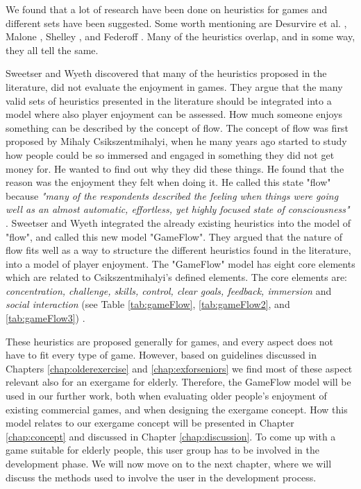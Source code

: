 We found that a lot of research have been done on heuristics for games and different sets have been suggested. Some worth mentioning are Desurvire et al. \cite{desurvire}, Malone \cite{malone}, Shelley \cite{shelley}, and Federoff \cite{federoff}. Many of the heuristics overlap, and in some way, they all tell the same. 

Sweetser and Wyeth \cite{sweetser} discovered that many of the heuristics proposed in the literature, did not evaluate the enjoyment in games. They argue that the many valid sets of heuristics presented in the literature should be integrated into a model where also player enjoyment can be assessed. How much someone enjoys something can be described by the concept of flow. The concept of flow was first proposed by  Mihaly Csikszentmihalyi, when he many years ago started to study how people could be so immersed and engaged in something they did not get money for. He wanted to find out why they did these things. He found that the reason was the enjoyment they felt when doing it. He called this state "flow" because \emph{"many of the respondents described the feeling when things were going well as an almost automatic, effortless, yet highly focused state of consciousness"} \cite{flow}.  Sweetser and Wyeth integrated the already existing heuristics into the model of "flow", and called this new model "GameFlow". They argued that the nature of flow fits well as a way to structure the different heuristics found in the literature, into a model of player enjoyment. The "GameFlow" model has eight core elements which are related to Csikszentmihalyi's defined elements. The core elements are: \emph{concentration, challenge, skills, control, clear goals, feedback, immersion} and \emph{social interaction} (see Table \ref{tab:gameFlow}, \ref{tab:gameFlow2}, and \ref{tab:gameFlow3}) \cite{sweetser}. 

These heuristics are proposed generally for games, and every aspect does not have to fit every type of game. However, based on guidelines discussed in Chapters \ref{chap:olderexercise} and \ref{chap:exforseniors} we find most of these aspect relevant also for an exergame for elderly. Therefore, the GameFlow model will be used in our further work, both when evaluating older people's enjoyment of existing commercial games, and when designing the exergame concept. How this model relates to our exergame concept will be presented in Chapter \ref{chap:concept} and discussed in Chapter \ref{chap:discussion}. To come up with a game suitable for elderly people, this user group has to be involved in the development phase. We will now move on to the next chapter, where we will discuss the methods used to involve the user in the development process.

